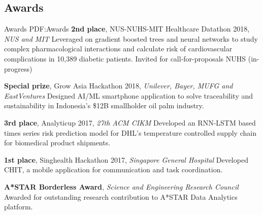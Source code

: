 \documentclass[letterpaper,10pt,oneside]{article}
\begin{document}
\begin{body}


\section
{Awards}
{Awards}
{PDF:Awards}
\textbf{2nd place}, \textcolor{mygray}{NUS-NUHS-MIT Healthcare Datathon 2018}, \textit{NUS and MIT}
\hfill{}
\GapNoBreak
\BulletItem
Leveraged on gradient boosted trees and neural networks to study complex pharmacological interactions and calculate risk of cardiovascular complications in 10,389 diabetic patients.
\BulletItem
Invited for call-for-proposals NUHS (in-progress)
\GapNoBreak
\medskip

\textbf{Special prize}, \textcolor{mygray}{Grow Asia Hackathon 2018}, \textit{Unilever, Bayer, MUFG and EastVentures}
\hfill{}
\GapNoBreak
\BulletItem
Designed AI/ML smartphone application to solve traceability and sustainability in Indonesia’s \$12B smallholder oil palm industry.
\GapNoBreak
\medskip

\textbf{3rd place}, \textcolor{mygray}{Analyticup 2017}, \textit{27th ACM CIKM}
\hfill{}
\GapNoBreak
\BulletItem
Developed an RNN-LSTM based times series risk prediction model for DHL’s temperature controlled supply chain for biomedical product shipments.
\GapNoBreak
\medskip

\textbf{1st place}, \textcolor{mygray}{Singhealth Hackathon 2017}, \textit{Singapore General Hospital}
\hfill{}
\BulletItem
Developed CHIT, a mobile application for communication and task coordination.
\GapNoBreak
\medskip


\textbf{A*STAR Borderless Award}, \textit{Science and Engineering Research Council}
\hfill
{}
\BulletItem
Awarded for outstanding research contribution to A*STAR Data Analytics platform.
\GapNoBreak
\medskip


\end{body}
\end{document}
